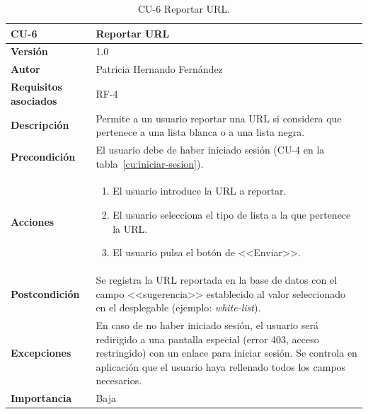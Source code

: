 \begin{table}[p]
	\centering
	\begin{tabularx}{\linewidth}{ p{} p{} }
		\toprule
		\textbf{CU-6}    & \textbf{Reportar URL}\\
		\toprule
		\textbf{Versión}              & 1.0    \\
		\textbf{Autor}                & Patricia Hernando Fernández \\
		\textbf{Requisitos asociados} & RF-4 \\
		\textbf{Descripción}          & Permite a un usuario reportar una
		URL si considera que pertenece a una lista blanca o a una lista negra.\\
		\textbf{Precondición}         & El usuario debe de haber iniciado sesión (CU-4 en la tabla~\ref{cu:iniciar-sesion}). \\
		\textbf{Acciones}             &
		\begin{enumerate}
			\def\labelenumi{\arabic{enumi}.}
			\tightlist
			\item El usuario introduce la URL a reportar.
			\item El usuario selecciona el tipo de lista a la que pertenece la URL.
			\item El usuario pulsa el botón de <<Enviar>>.
		\end{enumerate}\\
		\textbf{Postcondición}        & Se registra la URL reportada en la base de datos con el campo <<sugerencia>> establecido al valor seleccionado en el desplegable (ejemplo: \textit{white-list}). \\
		\textbf{Excepciones}          & En caso de no haber iniciado sesión, el usuario será redirigido a una pantalla especial (error 403, acceso restringido) con un enlace para iniciar sesión. Se controla en aplicación que el usuario haya rellenado todos los campos necesarios. \\
		\textbf{Importancia}          & Baja \\
		\bottomrule
	\end{tabularx}
	\caption{CU-6 Reportar URL.}
	\label{cu:reportar-url}
\end{table}

